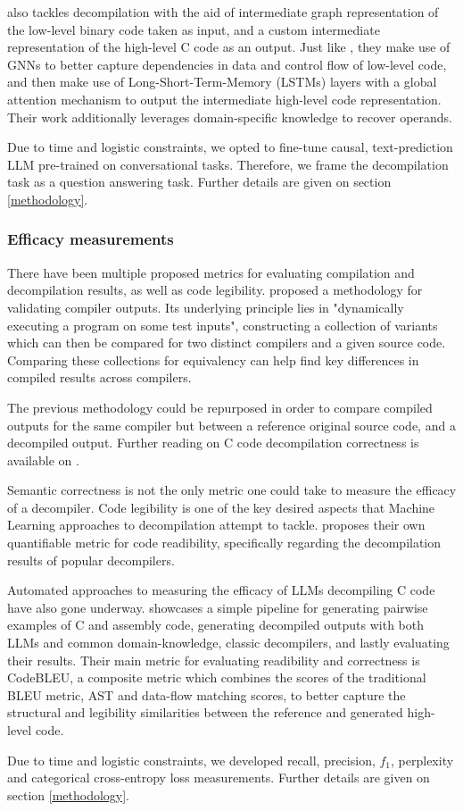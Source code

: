 \documentclass[../main.tex]{subfiles}
\begin{document}
\cite{cao_boosting_2022} also tackles decompilation with the aid of intermediate
graph representation of the low-level binary code taken as input, and a custom
intermediate representation of the high-level C code as an output. Just like 
\cite{fu_n-bref_2020}, they make use of GNNs to better capture dependencies in 
data and control flow of low-level code, and then make use of Long-Short-Term-Memory
(LSTMs) layers with a global attention mechanism to output the intermediate high-level
code representation.  Their work additionally leverages domain-specific knowledge
to recover operands.

Due to time and logistic constraints, we opted to fine-tune causal, text-prediction
LLM pre-trained on conversational tasks. Therefore, we frame the decompilation task
as a question answering task. Further details are given on section \ref{methodology}.

\subsubsection{Efficacy measurements}

There have been multiple proposed metrics for evaluating compilation and decompilation
results, as well as code legibility. \cite{le_compiler_2014} proposed a methodology
for validating compiler outputs. Its underlying principle lies in "dynamically
executing a program on some test inputs", constructing a collection of variants
which can then be compared for two distinct compilers and a given source code.
Comparing these collections for equivalency can help find key differences in compiled
results across compilers.

The previous methodology could be repurposed in order to compare compiled outputs
for the same compiler but between a reference original source code, and a decompiled
output. Further reading on C code decompilation correctness is available on 
\cite{liu_how_2020}.

Semantic correctness is not the only metric one could take to measure the efficacy
of a decompiler. Code legibility is one of the key desired aspects that Machine
Learning approaches to decompilation attempt to tackle. \cite{eom_r2i_2024} proposes
their own quantifiable metric for code readibility, specifically regarding the
decompilation results of popular decompilers.

Automated approaches to measuring the efficacy of LLMs decompiling C code have also
gone underway. \cite{vaaden_using_2024} showcases a simple pipeline for generating
pairwise examples of C and assembly code, generating decompiled outputs with both 
LLMs and common domain-knowledge, classic decompilers, and lastly evaluating their
results. Their main metric for evaluating readibility and correctness is CodeBLEU, a
composite metric \cite{ren2020codebleumethodautomaticevaluation} which combines the
scores of the traditional BLEU metric, AST and data-flow matching scores, to better
capture the structural and legibility similarities between the reference and generated
high-level code.

Due to time and logistic constraints, we developed recall, precision, $f_1$, 
perplexity and categorical cross-entropy loss measurements. Further details are
given on section \ref{methodology}.
\end{document}

